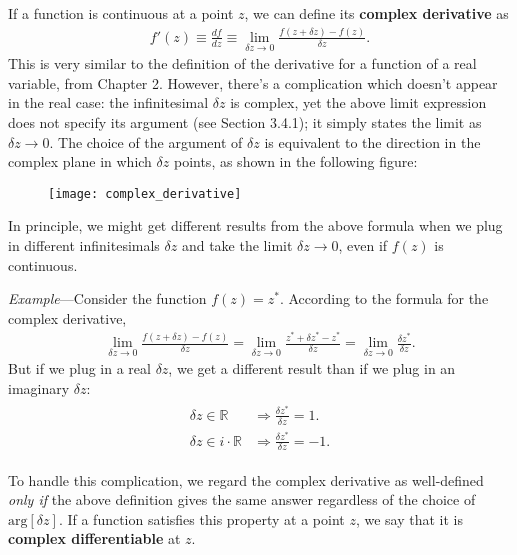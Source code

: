 \documentclass[10pt,a4paper]{article}
\begin{document}
If a function is continuous at a point $z$, we can define its
\textbf{complex derivative} as
\begin{align}
  f'(z) \equiv \frac{df}{dz} \equiv \lim_{\delta z\rightarrow 0} \frac{f(z+\delta z) - f(z)}{\delta z}.
\end{align}
This is very similar to the definition of the derivative for a
function of a real variable, from Chapter 2.  However, there's a
complication which doesn't appear in the real case: the infinitesimal
$\delta z$ is complex, yet the above limit expression does not specify
its argument (see Section 3.4.1); it simply states the limit as
$\delta z \rightarrow 0$.  The choice of the argument of $\delta z$ is
equivalent to the direction in the complex plane in which $\delta z$
points, as shown in the following figure:

\begin{figure}[ht]
  \centering\texttt{[image: complex\_derivative]}
\end{figure}

\clearpage

In principle, we might get different results from the above formula
when we plug in different infinitesimals $\delta z$ and take the limit
$\delta z \rightarrow 0$, even if $f(z)$ is continuous.

\begin{framed}\noindent
  \textit{Example}---Consider the function $f(z) = z^*$.  According to the formula for the complex derivative,
  \begin{align}
    \lim_{\delta z \rightarrow0} \frac{f(z+\delta z) - f(z)}{\delta z} = \lim_{\delta z \rightarrow0} \frac{z^*+\delta z^* - z^*}{\delta z} = \lim_{\delta z \rightarrow0} \frac{\delta z^*}{\delta z}.
  \end{align}
  But if we plug in a real $\delta z$, we get a different result than if we plug in an imaginary $\delta z$:
  \begin{align}
    \begin{aligned}\delta z \in \mathbb{R} \;\; &\Rightarrow \frac{\delta z^*}{\delta z} = 1.\\ \delta z \in i \cdot \mathbb{R} &\Rightarrow \frac{\delta z^*}{\delta z} = -1.\end{aligned}
  \end{align}
\end{framed}

To handle this complication, we regard the complex derivative as
well-defined \textit{only if} the above definition gives the same
answer regardless of the choice of $\mathrm{arg}[\delta z]$. If a
function satisfies this property at a point $z$, we say that it is
\textbf{complex differentiable} at $z$.
\end{document}
